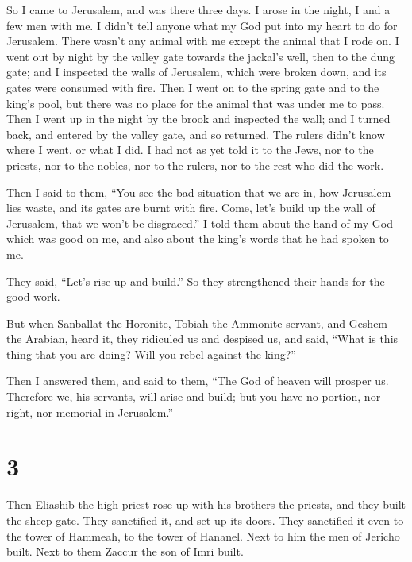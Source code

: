  So I came to Jerusalem, and was there three days.
 I arose in the night, I and a few men with me. I didn't
tell anyone what my God put into my heart to do for Jerusalem. There
wasn't any animal with me except the animal that I rode on.
 I went out by night by the valley gate towards the
jackal's well, then to the dung gate; and I inspected the walls of
Jerusalem, which were broken down, and its gates were consumed with
fire.  Then I went on to the spring gate and to the king's
pool, but there was no place for the animal that was under me to pass.
 Then I went up in the night by the brook and inspected the
wall; and I turned back, and entered by the valley gate, and so
returned.  The rulers didn't know where I went, or what I
did. I had not as yet told it to the Jews, nor to the priests, nor to
the nobles, nor to the rulers, nor to the rest who did the work.

 Then I said to them, ``You see the bad situation that we
are in, how Jerusalem lies waste, and its gates are burnt with fire.
Come, let's build up the wall of Jerusalem, that we won't be
disgraced.''  I told them about the hand of my God which
was good on me, and also about the king's words that he had spoken to
me.

They said, ``Let's rise up and build.'' So they strengthened their hands
for the good work.

 But when Sanballat the Horonite, Tobiah the Ammonite
servant, and Geshem the Arabian, heard it, they ridiculed us and
despised us, and said, ``What is this thing that you are doing? Will you
rebel against the king?''

 Then I answered them, and said to them, ``The God of
heaven will prosper us. Therefore we, his servants, will arise and
build; but you have no portion, nor right, nor memorial in Jerusalem.''

\hypertarget{section-2}{%
\section{3}\label{section-2}}

 Then Eliashib the high priest rose up with his brothers the
priests, and they built the sheep gate. They sanctified it, and set up
its doors. They sanctified it even to the tower of Hammeah, to the tower
of Hananel.  Next to him the men of Jericho built. Next to
them Zaccur the son of Imri built.

